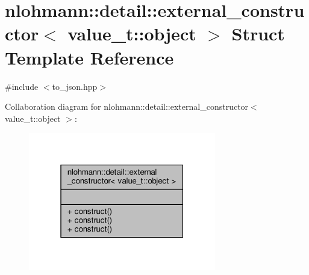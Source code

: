 \hypertarget{structnlohmann_1_1detail_1_1external__constructor_3_01value__t_1_1object_01_4}{}\section{nlohmann\+:\+:detail\+:\+:external\+\_\+constructor$<$ value\+\_\+t\+:\+:object $>$ Struct Template Reference}
\label{structnlohmann_1_1detail_1_1external__constructor_3_01value__t_1_1object_01_4}


{\ttfamily \#include $<$to\+\_\+json.\+hpp$>$}



Collaboration diagram for nlohmann\+:\+:detail\+:\+:external\+\_\+constructor$<$ value\+\_\+t\+:\+:object $>$\+:
\nopagebreak
\begin{figure}[H]
\begin{center}
\leavevmode
\includegraphics[width=232pt]{structnlohmann_1_1detail_1_1external__constructor_3_01value__t_1_1object_01_4__coll__graph}
\end{center}
\end{figure}
